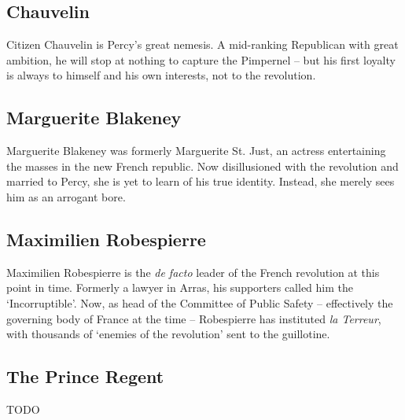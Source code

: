\subsection*{Chauvelin}

Citizen Chauvelin is Percy's great nemesis. A mid-ranking Republican with great ambition, he will stop at nothing to capture the Pimpernel -- but his first loyalty is always to himself and his own interests, not to the revolution.

\subsection*{Marguerite Blakeney}

Marguerite Blakeney was formerly Marguerite St. Just, an actress entertaining the masses in the new French republic. Now disillusioned with the revolution and married to Percy, she is yet to learn of his true identity. Instead, she merely sees him as an arrogant bore.

\subsection*{Maximilien Robespierre}

Maximilien Robespierre is the \emph{de facto} leader of the French revolution at this point in time. Formerly a lawyer in Arras, his supporters called him the `Incorruptible'. Now, as head of the Committee of Public Safety -- effectively the governing body of France at the time -- Robespierre has instituted \emph{la Terreur}, with thousands of `enemies of the revolution' sent to the guillotine.

\subsection*{The Prince Regent}

TODO
